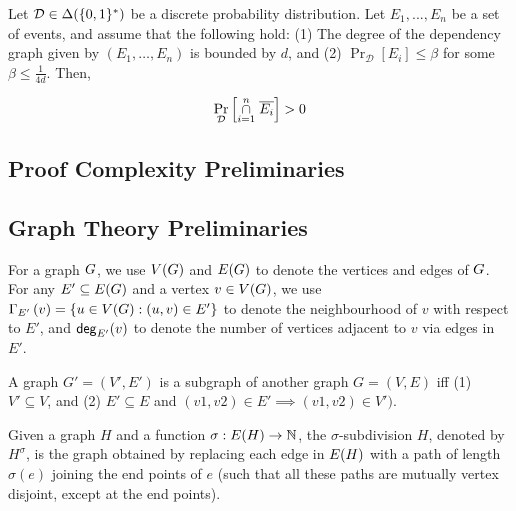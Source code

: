 \documentclass[11pt]{article}
\newcommand{\Subdivision}[2]{{#1}^{#2}}
\newcommand{\DistSet}[1]{\Delta(#1)}
\newcommand{\Dist}{\mathcal{D}}
\newcommand{\PProb}[2]{\Pr_{#2}\left[#1 \right]}
\begin{document}
\begin{lemma}\label{lemma:lll}Let $\Dist \in \DistSet{\bit^*}$ be a discrete probability distribution.
Let $E_1,...,E_n$ be a set of events, and assume that the following hold: (1) The degree of the dependency graph given by $(E_1, \dots, E_n)$ is bounded by $d$, and (2) $\PProb{E_i}{\Dist} \leq \beta$ for some $\beta \leq \frac{1}{4d}$. Then,

\[ \PProb{\overset{n}{ \underset{i=1}{\cap}} \hspace{0.1cm}  \overline{E_i}}{\Dist} > 0\]	
	
\end{lemma}

\subsection{Proof Complexity Preliminaries}

\begin{definition}\label{def:poly-calc-refutations}
	
\end{definition}

\subsection{Graph Theory Preliminaries}

For a graph $G$, we use $V(G)$ and $E(G)$ to denote the vertices and edges of $G$. 
For any $E' \subseteq E(G)$ and a vertex $v \in V(G)$, we use $\Gamma_{E'}\left(v\right) = \{ u \in V(G) : (u,v) \in E' \}$ to denote the neighbourhood of $v$ with respect to $E'$, and $\mathsf{deg}_{E'}(v)$ to denote the number of vertices adjacent to $v$ via edges in $E'$.

\begin{definition}[Subgraph]\label{def:subgraph}
A graph $G'=(V', E')$ is a subgraph of another graph $G=(V, E)$ iff (1) $V'\subseteq V$, and (2) $E'\subseteq E$ and  $(v1, v2) \in E' \implies (v1, v2) \in V')$.
	
\end{definition}

\begin{definition}\label{def:subdivisions}
Given a graph $H$ and a function $\sigma: E(H) \rightarrow \mathbb{N}$, the $\sigma$-subdivision $H$, denoted by $\Subdivision{H}{\sigma}$, is the graph obtained by replacing each edge in $E(H)$ with a path of length $\sigma(e)$ joining the end points of $e$ (such that all these paths are mutually vertex disjoint, except at the end points).	
\end{definition}
\end{document}
